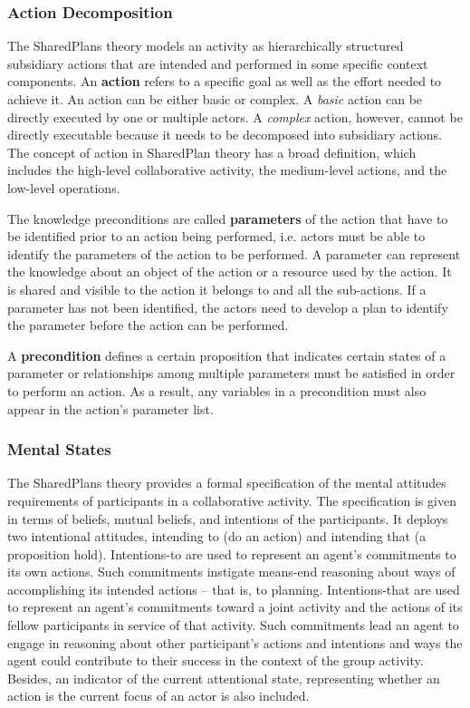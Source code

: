 \subsubsection*{Action Decomposition}
The SharedPlans theory models an activity as hierarchically structured subsidiary actions that are intended and performed in some specific context components. An \textbf{action} refers to a specific goal as well as the effort needed to achieve it. An action can be either basic or complex. A \emph{basic} action can be directly executed by one or multiple actors. A \emph{complex} action, however, cannot be directly executable because it needs to be decomposed into subsidiary actions. The concept of action in SharedPlan theory has a broad definition, which includes the high-level collaborative activity, the medium-level actions, and the low-level operations.

The knowledge preconditions are called \textbf{parameters} of the action that have to be identified prior to an action being performed, i.e. actors must be able to identify the parameters of the action to be performed. A parameter can represent the knowledge about an object of the action or a resource used by the action. It is shared and visible to the action it belongs to and all the sub-actions. If a parameter has not been identified, the actors need to develop a plan to identify the parameter before the action can be performed.

A \textbf{precondition} defines a certain proposition that indicates certain states of a parameter or relationships among multiple parameters must be satisfied in order to perform an action. As a result, any variables in a precondition must also appear in the action's parameter list. 

\subsubsection*{Mental States}
The SharedPlans theory provides a formal specification of the mental attitudes requirements of participants in a collaborative activity. The specification is given in terms of beliefs, mutual beliefs, and intentions of the participants. It deploys two intentional attitudes, intending to (do an action) and intending that (a proposition hold). Intentions-to are used to represent an agent’s commitments to its own actions. Such commitments instigate means-end reasoning about ways of accomplishing its intended actions – that is, to planning. Intentions-that are used to represent an agent’s commitments toward a joint activity and the actions of its fellow participants in service of that activity. Such commitments lead an agent to engage in reasoning about other participant’s actions and intentions and ways the agent could contribute to their success in the context of the group activity. Besides, an indicator of the current attentional state, representing whether an action is the current focus of an actor is also included. 

